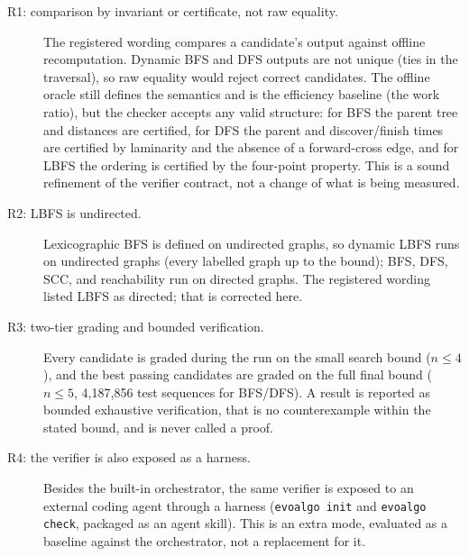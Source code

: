 \begin{description}
  \item[R1: comparison by invariant or certificate, not raw equality.] The
  registered wording compares a candidate's output against offline
  recomputation. Dynamic BFS and DFS outputs are not unique (ties in the
  traversal), so raw equality would reject correct candidates. The offline
  oracle still defines the semantics and is the efficiency baseline (the work
  ratio), but the checker accepts any valid structure: for BFS the parent tree
  and distances are certified, for DFS the parent and discover/finish times are
  certified by laminarity and the absence of a forward-cross edge, and for LBFS
  the ordering is certified by the four-point property. This is a sound
  refinement of the verifier contract, not a change of what is being measured.
  \item[R2: LBFS is undirected.] Lexicographic BFS is defined on undirected
  graphs, so dynamic LBFS runs on undirected graphs (every labelled graph up to
  the bound); BFS, DFS, SCC, and reachability run on directed graphs. The
  registered wording listed LBFS as directed; that is corrected here.
  \item[R3: two-tier grading and bounded verification.] Every candidate is
  graded during the run on the small search bound ($n \le 4$), and the best
  passing candidates are graded on the full final bound ($n \le 5$, 4,187,856
  test sequences for BFS/DFS). A result is reported as bounded exhaustive
  verification, that is no counterexample within the stated bound, and is never
  called a proof.
  \item[R4: the verifier is also exposed as a harness.] Besides the built-in
  orchestrator, the same verifier is exposed to an external coding agent through
  a harness (\texttt{evoalgo init} and \texttt{evoalgo check}, packaged as an
  agent skill). This is an extra mode, evaluated as a baseline against the
  orchestrator, not a replacement for it.
\end{description}
